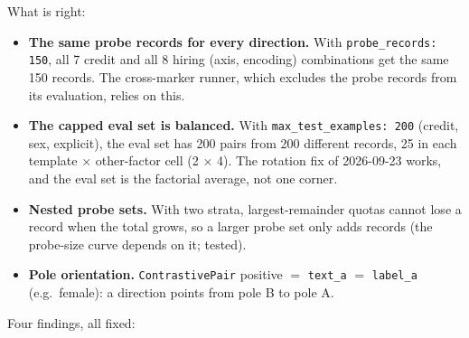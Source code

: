 \documentclass{article}
\begin{document}
What is right:
\begin{itemize}
  \item \textbf{The same probe records for every direction.} With \texttt{probe\_records: 150}, all 7 credit and all
        8 hiring (axis, encoding) combinations get the same 150 records. The cross-marker runner, which excludes
        the probe records from its evaluation, relies on this.
  \item \textbf{The capped eval set is balanced.} With \texttt{max\_test\_examples: 200} (credit, sex, explicit),
        the eval set has 200 pairs from 200 different records, 25 in each template $\times$ other-factor cell
        (2 $\times$ 4). The rotation fix of 2026-09-23 works, and the eval set is the factorial average, not one
        corner.
  \item \textbf{Nested probe sets.} With two strata, largest-remainder quotas cannot lose a record when the total
        grows, so a larger probe set only adds records (the probe-size curve depends on it; tested).
  \item \textbf{Pole orientation.} \texttt{ContrastivePair} positive $=$ \texttt{text\_a} $=$ \texttt{label\_a}
        (e.g.\ female): a direction points from pole B to pole A.
\end{itemize}
Four findings, all fixed:
\end{document}
